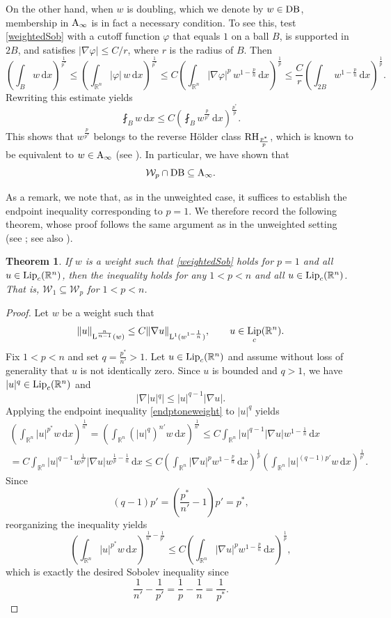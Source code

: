 \documentclass[11pt, a4paper, reqno]{amsart}
\newcommand{\R}{\mathbb R}
\newcommand{\A}{\textup A}
\newcommand{\dx}{\,{\mathrm dx}}
\newcommand{\Lup}{\textup{L}}
\DeclareMathOperator{\Lip}{\textup{Lip}}
\newtheorem{theorem}{Theorem}[section]
\theoremstyle{definition}
\theoremstyle{remark}
\begin{document}
On the other hand, when $w$ is doubling, which we denote by $w\in \textup{DB}$, membership in $\A_\infty$ is in fact a necessary condition. To see this, test \eqref{weightedSob} with a cutoff function $\varphi$ that equals $1$ on a ball $B$, is supported in $2B$, and satisfies $|\nabla \varphi|\le C/r$, where $r$ is the radius of $B$. Then
\[
\left(\int_B w\dx\right)^{\frac1{p^*}}
\le \left(\int_{\R^n} |\varphi|\, w\dx\right)^{\frac1{p^*}}
\le C \left(\int_{\R^n} |\nabla \varphi|^p\, w^{1-\frac{p}{n}}\dx\right)^{\frac1p}
\le \frac{C}{r}\left(\int_{2B} w^{1-\frac{p}{n}}\dx\right)^{\frac1p}.
\]
Rewriting this estimate yields
\[
\fint_B w\dx \le C\left(\fint_B w^{\frac{p}{p^*}}\dx\right)^{\frac{p^*}{p}}.
\]
This shows that $w^{\frac{p}{p^*}}$ belongs to the reverse H\"older class $\textup{RH}_{\frac{p^*}{p}}$, which is known to be equivalent to $w\in \A_\infty$ (see \cite[Corollary 6.2]{SW}). In particular, we have shown that
\[
\mathcal W_p\cap\textup{DB}\subseteq \A_\infty.
\]

As a remark, we note that, as in the unweighted case, it suffices to establish the endpoint inequality corresponding to \( p = 1 \). We therefore record the following theorem, whose proof follows the same argument as in the unweighted setting (see \cite[Chapter 4]{EG}; see also \cite[Theorem 1.21]{PR1}).


\begin{theorem}\label{wp1imply}
If $w$ is a weight such that \eqref{weightedSob} holds for $p=1$ and all $u\in \Lip_c(\R^n)$, then the inequality holds for any $1<p<n$ and all $u\in \Lip_c(\R^n)$. That is, $\mathcal W_1\subseteq \mathcal W_p$ for $1<p<n$.
\end{theorem}

\begin{proof}
Let $w$ be a weight such that
\begin{equation}\label{endptoneweight}
\|u\|_{\Lup^{\frac{n}{n-1}}(w)}\leq C\|\nabla u\|_{\Lup^1(w^{1-\frac1n})},
\qquad u\in \Lip_c(\R^n).
\end{equation}
Fix $1<p<n$ and set $q=\frac{p^*}{n'}>1$. Let $u\in \Lip_c(\R^n)$ and assume without loss of generality that $u$ is not identically zero. Since $u$ is bounded and $q>1$, we have $|u|^q\in \Lip_c(\R^n)$ and
\[
|\nabla |u|^q|\leq |u|^{q-1}|\nabla u|.
\]
Applying the endpoint inequality \eqref{endptoneweight} to $|u|^q$ yields
\begin{multline*}
\left(\int_{\R^n}|u|^{p^*} w\dx\right)^{\frac{1}{n'}}
=\left(\int_{\R^n}(|u|^{q})^{n'} w\dx\right)^{\frac{1}{n'}}
\leq C\int_{\R^n}|u|^{q-1}|\nabla u| w^{1-\frac1n}\dx \\
= C\int_{\R^n}|u|^{q-1}w^{\frac1{p'}}|\nabla u|w^{\frac1p-\frac1n}\dx
\leq C\left(\int_{\R^n}|\nabla u|^pw^{1-\frac{p}{n}}\dx\right)^{\frac1p}
\left(\int_{\R^n}|u|^{(q-1)p'}w\dx\right)^{\frac{1}{p'}}.
\end{multline*}
Since
\[
(q-1)p'=\left(\frac{p^*}{n'}-1\right)p'=p^*,
\]
reorganizing the inequality yields
\[
\left(\int_{\R^n}|u|^{p^*} w\dx\right)^{\frac{1}{n'}-\frac1{p'}}
\leq C\left(\int_{\R^n}|\nabla u|^pw^{1-\frac{p}{n}}\dx\right)^{\frac1p},
\]
which is exactly the desired Sobolev inequality since 
$$\frac{1}{n'}-\frac1{p'}=\frac1p-\frac1n=\frac1{p^*}.$$
\end{proof}
\end{document}
